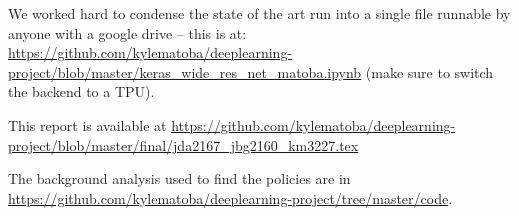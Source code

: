 \documentclass[10pt,twocolumn,letterpaper]{article}
\begin{document}
  We worked hard to condense the state of the art run into a single file runnable by anyone with a google drive -- this is at: \url{https://github.com/kylematoba/deeplearning-project/blob/master/keras_wide_res_net_matoba.ipynb} (make sure to switch the backend to a TPU).

  This report is available at \url{https://github.com/kylematoba/deeplearning-project/blob/master/final/jda2167_jbg2160_km3227.tex}

  The background analysis used to find the policies are in \url{https://github.com/kylematoba/deeplearning-project/tree/master/code}.


\nocite{Torralba2008}
{\small


}
\end{document}
